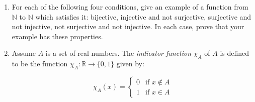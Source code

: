 \documentclass{amsart}
\theoremstyle{definition}
\begin{document}
\begin{enumerate}
\item For each of the following four conditions, give an example of a function from $\mathbb{N}$ to $\mathbb{N}$ which satisfies it: bijective, injective and not surjective, surjective and not injective, not surjective and not injective. In each case, prove that your example has these properties.
\item Assume $A$ is a set of real numbers. The \emph{indicator function} $\chi_A$ of $A$ is defined to be the function $\chi_A : \mathbb{R} \to \{0, 1\}$ given by:

  $$
  \chi_A (x) = \begin{cases}
    0 &\text{if } x \notin A \\
    1 &\text{if } x \in A
  \end{cases}
  $$


\end{enumerate}
\end{document}
